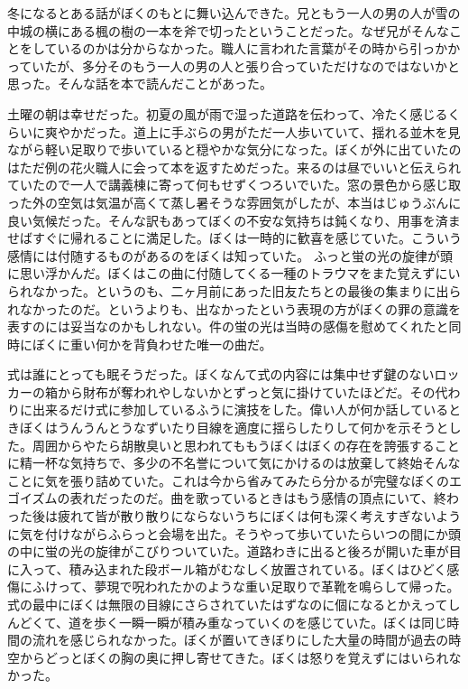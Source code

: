 \documentclass[b5j,twoside,twocolumn]{utarticle}
\begin{document}
冬になるとある話がぼくのもとに舞い込んできた。兄ともう一人の男の人が雪の中城の横にある楓の樹の一本を斧で切ったということだった。なぜ兄がそんなことをしているのかは分からなかった。職人に言われた言葉がその時から引っかかっていたが、多分そのもう一人の男の人と張り合っていただけなのではないかと思った。そんな話を本で読んだことがあった。


土曜の朝は幸せだった。初夏の風が雨で湿った道路を伝わって、冷たく感じるくらいに爽やかだった。道上に手ぶらの男がただ一人歩いていて、揺れる並木を見ながら軽い足取りで歩いていると穏やかな気分になった。ぼくが外に出ていたのはただ例の花火職人に会って本を返すためだった。来るのは昼でいいと伝えられていたので一人で講義棟に寄って何もせずくつろいでいた。窓の景色から感じ取った外の空気は気温が高くて蒸し暑そうな雰囲気がしたが、本当はじゅうぶんに良い気候だった。そんな訳もあってぼくの不安な気持ちは鈍くなり、用事を済ませばすぐに帰れることに満足した。ぼくは一時的に歓喜を感じていた。こういう感情には付随するものがあるのをぼくは知っていた。
ふっと蛍の光の旋律が頭に思い浮かんだ。ぼくはこの曲に付随してくる一種のトラウマをまた覚えずにいられなかった。というのも、二ヶ月前にあった旧友たちとの最後の集まりに出られなかったのだ。というよりも、出なかったという表現の方がぼくの罪の意識を表すのには妥当なのかもしれない。件の蛍の光は当時の感傷を慰めてくれたと同時にぼくに重い何かを背負わせた唯一の曲だ。


式は誰にとっても眠そうだった。ぼくなんて式の内容には集中せず鍵のないロッカーの箱から財布が奪われやしないかとずっと気に掛けていたほどだ。その代わりに出来るだけ式に参加しているふうに演技をした。偉い人が何か話しているときぼくはうんうんとうなずいたり目線を適度に揺らしたりして何かを示そうとした。周囲からやたら胡散臭いと思われてももうぼくはぼくの存在を誇張することに精一杯な気持ちで、多少の不名誉について気にかけるのは放棄して終始そんなことに気を張り詰めていた。これは今から省みてみたら分かるが完璧なぼくのエゴイズムの表れだったのだ。曲を歌っているときはもう感情の頂点にいて、終わった後は疲れて皆が散り散りにならないうちにぼくは何も深く考えすぎないように気を付けながらふらっと会場を出た。そうやって歩いていたらいつの間にか頭の中に蛍の光の旋律がこびりついていた。道路わきに出ると後ろが開いた車が目に入って、積み込まれた段ボール箱がむなしく放置されている。ぼくはひどく感傷にふけって、夢現で呪われたかのような重い足取りで革靴を鳴らして帰った。式の最中にぼくは無限の目線にさらされていたはずなのに個になるとかえってしんどくて、道を歩く一瞬一瞬が積み重なっていくのを感じていた。ぼくは同じ時間の流れを感じられなかった。ぼくが置いてきぼりにした大量の時間が過去の時空からどっとぼくの胸の奥に押し寄せてきた。ぼくは怒りを覚えずにはいられなかった。
\end{document}
